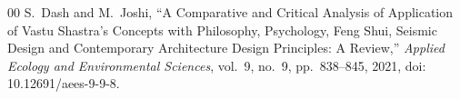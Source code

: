 \documentclass[10pt, twocolumn, letterpaper]{article}
\begin{document}
\begin{thebibliography}{00}
S.~Dash and M.~Joshi,
``A Comparative and Critical Analysis of Application of Vastu Shastra's Concepts
with Philosophy, Psychology, Feng Shui, Seismic Design and Contemporary Architecture
Design Principles: A Review,''
\textit{Applied Ecology and Environmental Sciences}, vol.~9, no.~9, pp.~838--845,
2021, doi: 10.12691/aees-9-9-8.

\end{thebibliography}
\end{document}
